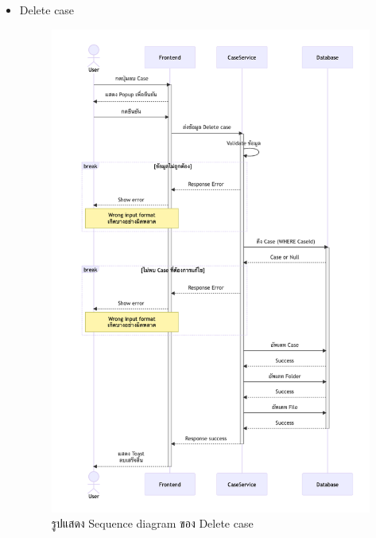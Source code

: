 \documentclass[12pt,oneside,openright,a4paper]{cpe-thai-project}
\begin{document}
\begin{itemize}
    \newpage
    \item Delete case \\
    \begin{figure}[!ht]\centering
        \includegraphics[width=13cm, trim={0 1cm 0 1cm},clip]{./assets/sequence-diagram/delete-case.png}
        \caption{รูปแสดง Sequence diagram ของ Delete case}\label{fig:sqDeleteCase}
    \end{figure}


\end{itemize}
\end{document}
